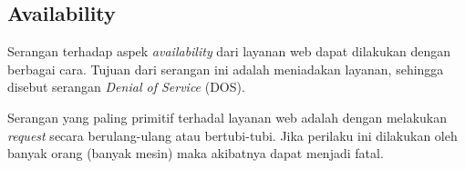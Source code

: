 \subsection{Availability}
Serangan terhadap aspek {\em availability} dari layanan web dapat dilakukan
dengan berbagai cara. Tujuan dari serangan ini adalah meniadakan layanan,
sehingga disebut serangan {\em Denial of Service} (DOS).

Serangan yang paling primitif terhadal layanan web adalah dengan melakukan {\em
request} secara berulang-ulang atau bertubi-tubi. Jika perilaku ini dilakukan
oleh banyak orang (banyak mesin) maka akibatnya dapat menjadi fatal.
